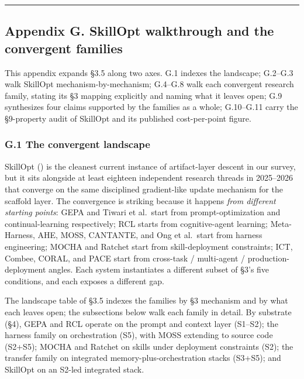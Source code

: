 \documentclass[
]{article}
\begin{document}
\begin{center}\rule{0.5\linewidth}{0.5pt}\end{center}

\subsection{Appendix G. SkillOpt walkthrough and the convergent
families}\label{appendix-g.-skillopt-walkthrough-and-the-convergent-families}

This appendix expands §3.5 along two axes. G.1 indexes the landscape;
G.2--G.3 walk SkillOpt mechanism-by-mechanism; G.4--G.8 walk each
convergent research family, stating its §3 mapping explicitly and naming
what it leaves open; G.9 synthesizes four claims supported by the
families as a whole; G.10--G.11 carry the §9-property audit of SkillOpt
and its published cost-per-point figure.

\subsubsection{G.1 The convergent
landscape}\label{g.1-the-convergent-landscape}

SkillOpt () is the
cleanest current instance of artifact-layer descent in our survey, but
it sits alongside at least eighteen independent research threads in
2025--2026 that converge on the same disciplined gradient-like update
mechanism for the scaffold layer. The convergence is striking because it
happens \emph{from different starting points}: GEPA and Tiwari et
al.~start from prompt-optimization and continual-learning respectively;
RCL starts from cognitive-agent learning; Meta-Harness, AHE, MOSS,
CANTANTE, and Ong et al.~start from harness engineering; MOCHA and
Ratchet start from skill-deployment constraints; ICT, Combee, CORAL, and
PACE start from cross-task / multi-agent / production-deployment angles.
Each system instantiates a different subset of §3's five conditions, and
each exposes a different gap.

The landscape table of §3.5 indexes the families by §3 mechanism and by
what each leaves open; the subsections below walk each family in detail.
By substrate (§4), GEPA and RCL operate on the prompt and context layer
(S1--S2); the harness family on orchestration (S5), with MOSS extending
to source code (S2+S5); MOCHA and Ratchet on skills under deployment
constraints (S2); the transfer family on integrated
memory-plus-orchestration stacks (S3+S5); and SkillOpt on an S2-led
integrated stack.
\end{document}
